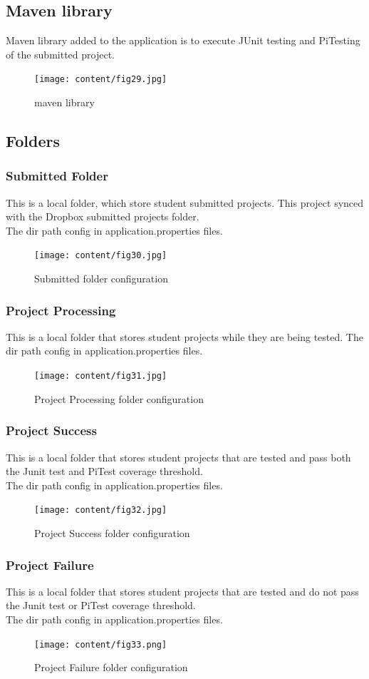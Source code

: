 \subsection{Maven library}
Maven library added to the application is to execute JUnit testing and PiTesting of the submitted project.
\begin{figure}[h!]
	\centering
	\texttt{[image: content/fig29.jpg]}
	\caption{maven library}
	\label{fig:f11}
\end{figure}
\subsection{Folders}
\subsubsection{Submitted Folder}
This is a local folder, which store student submitted projects. This project synced with the Dropbox submitted projects folder.\\
The dir path config in application.properties files.
\begin{figure}[h!]
	\centering
	\texttt{[image: content/fig30.jpg]}
	\caption{Submitted folder configuration}
	\label{fig:f11}
\end{figure}
\newpage
\subsubsection{Project Processing}
This is a local folder that stores student projects while they are being tested. The dir path config in application.properties files.
\begin{figure}[h!]
	\centering
	\texttt{[image: content/fig31.jpg]}
	\caption{Project Processing folder configuration}
	\label{fig:f11}
\end{figure}
\subsubsection{Project Success}
This is a local folder that stores student projects that are tested and pass both the Junit test and PiTest coverage threshold.\\
The dir path config in application.properties files.
\begin{figure}[h!]
	\centering
	\texttt{[image: content/fig32.jpg]}
	\caption{Project Success folder configuration}
	\label{fig:f11}
\end{figure}
\subsubsection{Project Failure}
This is a local folder that stores student projects that are tested and do not pass the Junit test or PiTest coverage threshold.\\
The dir path config in application.properties files.
 \begin{figure}[h!]
	\centering
	\texttt{[image: content/fig33.png]}
	\caption{Project Failure folder configuration}
	\label{fig:f11}
\end{figure}

